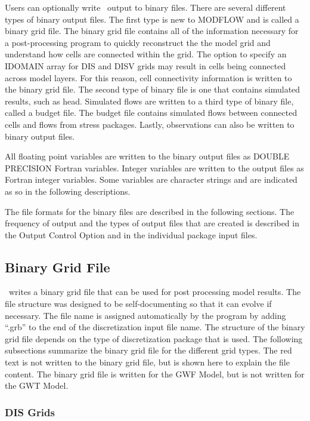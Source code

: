 Users can optionally write \mf~output to binary files.  There are several different types of binary output files.  The first type is new to MODFLOW and is called a binary grid file.  The binary grid file contains all of the information necessary for a post-processing program to quickly reconstruct the the model grid and understand how cells are connected within the grid.  The option to specify an IDOMAIN array for DIS and DISV grids may result in cells being connected across model layers.  For this reason, cell connectivity information is written to the binary grid file. The second type of binary file is one that contains simulated results, such as head.  Simulated flows are written to a third type of binary file, called a budget file.  The budget file contains simulated flows between connected cells and flows from stress packages.  Lastly, observations can also be written to binary output files.

All floating point variables are written to the binary output files as DOUBLE PRECISION Fortran variables. Integer variables are written to the output files as Fortran integer variables. Some variables are character strings and are indicated as so in the following descriptions.

The file formats for the binary files are described in the following sections. The frequency of output and the types of output files that are created is described in the Output Control Option and in the individual package input files.

\newpage
\subsection{Binary Grid File}
\mf~writes a binary grid file that can be used for post processing model results.  The file structure was designed to be self-documenting so that it can evolve if necessary.  The file name is assigned automatically by the program by adding ``.grb'' to the end of the discretization input file name.  The structure of the binary grid file depends on the type of discretization package that is used.  The following subsections summarize the binary grid file for the different grid types.  The red text is not written to the binary grid file, but is shown here to explain the file content.  The binary grid file is written for the GWF Model, but is not written for the GWT Model.

\newpage
\subsubsection{DIS Grids}

